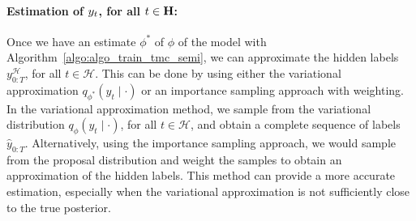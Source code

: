 




\paragraph*{Estimation of $y_{t}$, for all $t \in \mathbf{H}$: } 


Once we have an estimate \(\phi^*\) of \(\phi\) of the model with Algorithm~\ref{algo:algo_train_tmc_semi},
we can approximate the hidden labels \(y_{0:T}^{\mathcal{H}}\), for all \(t \in
\mathcal{H}\). This can be done by using either the variational approximation
\(q_{\phi^*}(y_t \mid \cdot)\) or an importance sampling approach with weighting.
In the variational approximation method, we sample from the variational
distribution \(q_{\phi}(y_t \mid \cdot)\), for all \(t \in \mathcal{H}\), and
obtain a complete sequence of labels \(\hat{y}_{0:T}\). Alternatively, using the
importance sampling approach, we would sample from the proposal distribution and
weight the samples to obtain an approximation of the hidden labels. This method
can provide a more accurate estimation, especially when the variational
approximation is not sufficiently close to the true posterior.


